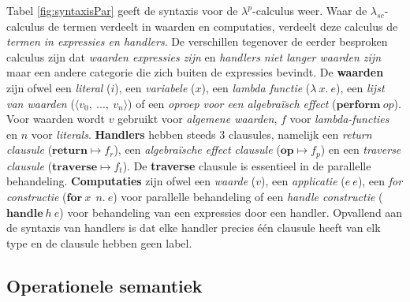 Tabel \ref{fig:syntaxisPar} geeft de syntaxis voor de $\lambda^{p}$-calculus weer. \newline
Waar de $\lambda_{sc}$-calculus de termen verdeelt in waarden en computaties, verdeelt deze calculus de \emph{termen in expressies en handlers}. De verschillen tegenover de eerder besproken calculus zijn dat \emph{waarden expressies zijn} en \emph{handlers niet langer waarden zijn} maar een andere categorie die zich buiten de expressies bevindt. \newline
De \textbf{waarden} zijn ofwel een \emph{literal} ($i$), een \emph{variabele} ($x$), een \emph{lambda functie} ($\lambda\:x.\:e$), een \emph{lijst van waarden} ($\langle v_{0},\: ...,\: v_{n} \rangle$) of een \emph{oproep voor een algebraïsch effect} ($\textbf{perform}\:op$). Voor waarden wordt $v$ gebruikt voor \emph{algemene waarden}, $f$ voor \emph{lambda-functies} en $n$ voor \emph{literals}. \newline 
\textbf{Handlers} hebben steeds 3 clausules, namelijk een \emph{return clausule} ($\textbf{return} \mapsto f_{r}$), een \emph{algebraïsche effect clausule} ($\textbf{op} \mapsto f_{p}$) en een \emph{traverse clausule} ($\textbf{traverse} \mapsto f_{t}$). De \textbf{traverse} clausule is essentieel in de parallelle behandeling. \newline 
\textbf{Computaties} zijn ofwel een \emph{waarde} ($v$), een \emph{applicatie} ($e \  e$), een \emph{for constructie} ($\textbf{for} \  x \ \  n.\  e$) voor parallelle behandeling of een \emph{handle constructie} ($\textbf{handle} \  h  \  e$) voor behandeling van een expressies door een handler. \newline
Opvallend aan de syntaxis van handlers is dat elke handler precies \'{e}\'{e}n clausule heeft van elk type en de clausule hebben geen label.

\subsection{Operationele semantiek}

